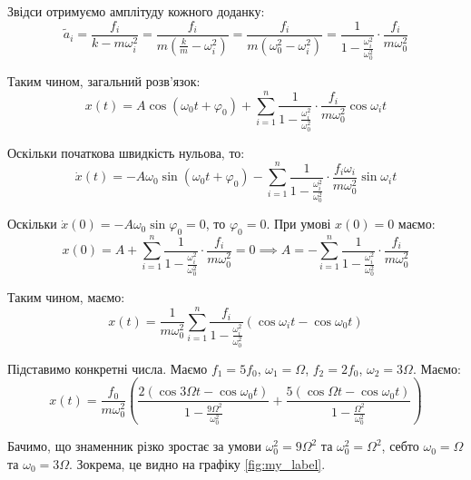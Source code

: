 \documentclass{hw_template}
\begin{document}
Звідси отримуємо амплітуду кожного доданку:
\begin{equation*}
    \widetilde{a}_i = \frac{f_i}{k-m\omega_i^2} = \frac{f_i}{m\left(\frac{k}{m}-\omega_i^2\right)} = \frac{f_i}{m(\omega_0^2-\omega_i^2)} = \frac{1}{1-\frac{\omega_i^2}{\omega_0^2}}\cdot\frac{f_i}{m\omega_0^2}
\end{equation*}

Таким чином, загальний розв'язок:
\begin{equation*}
    x(t) = A \cos (\omega_0 t + \varphi_0) + \sum_{i=1}^n \frac{1}{1-\frac{\omega_i^2}{\omega_0^2}}\cdot\frac{f_i}{m\omega_0^2}\cos \omega_i t
\end{equation*}

Оскільки початкова швидкість нульова, то:
\begin{equation*}
    \dot{x}(t) = -A\omega_0 \sin(\omega_0 t + \varphi_0) - \sum_{i=1}^n \frac{1}{1-\frac{\omega_i^2}{\omega_0^2}}\cdot\frac{f_i\omega_i}{m\omega_0^2}\sin \omega_i t
\end{equation*}

Оскільки $\dot{x}(0) = -A\omega_0 \sin \varphi_0 = 0$, то $\varphi_0=0$. При
умові $x(0)=0$ маємо:
\begin{equation*}
    x(0) = A + \sum_{i=1}^n \frac{1}{1-\frac{\omega_i^2}{\omega_0^2}}\cdot\frac{f_i}{m\omega_0^2} = 0 \implies A = -\sum_{i=1}^n \frac{1}{1-\frac{\omega_i^2}{\omega_0^2}}\cdot\frac{f_i}{m\omega_0^2}
\end{equation*}

Таким чином, маємо:
\begin{equation*}
    \boxed{x(t) = \frac{1}{m\omega_0^2}\sum_{i=1}^n \frac{f_i}{1-\frac{\omega_i^2}{\omega_0^2}}\left(\cos \omega_i t - \cos \omega_0 t\right)}
\end{equation*}

Підставимо конкретні числа. Маємо $f_1=5f_0$, $\omega_1=\Omega$, $f_2=2f_0$, $\omega_2=3\Omega$. Маємо:
\begin{equation*}
    x(t) = \frac{f_0}{m\omega_0^2}\left( \frac{2(\cos 3\Omega t - \cos \omega_0 t)}{1 - \frac{9\Omega^2}{\omega_0^2}} + \frac{5(\cos \Omega t - \cos \omega_0 t)}{1 - \frac{\Omega^2}{\omega_0^2}}\right)
\end{equation*}

Бачимо, що знаменник різко зростає за умови $\omega_0^2=9\Omega^2$ та
$\omega_0^2=\Omega^2$, себто $\omega_0=\Omega$ та $\omega_0=3\Omega$.
Зокрема, це видно на графіку \ref{fig:my_label}.
\end{document}
